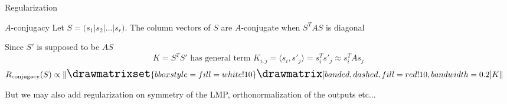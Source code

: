 \documentclass[10pt,aspectratio=169]{beamer}
\begin{document}

\begin{frame}{Regularization}
\begin{block}{$A$-conjugacy}
    Let $S = \Big( s_1 \big\rvert s_2 \big\lvert \dots \big\rvert s_r \Big)$. The column vectors of $S$ are $A$-conjugate when $S^TAS$ is diagonal

    Since $S'$ is supposed to be $AS$
    \begin{equation}
        K = S^TS' \text{ has general term } K_{i,j}= \langle s_i, s'_j \rangle = s_i^Ts'_j \approx s_i^TAs_j
    \end{equation}
    \begin{align}
        R_{\text{conjugacy}}(S) &\propto \Large\lVert\drawmatrixset{bbox style={fill=white!10}}\drawmatrix[banded, dashed,fill=red!10, bandwidth=0.2]K\Large\rVert
    \end{align}
\end{block}
But we may also add regularization on symmetry of the LMP, orthonormalization of the outputs etc...
\end{frame}
\end{document}
